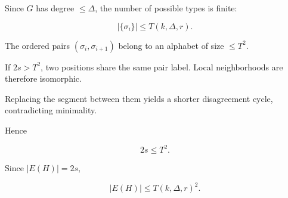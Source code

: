 \documentclass[11pt]{article}
\begin{document}
Since $G$ has degree $\le \Delta$,
the number of possible types is finite:

\[
|\{\sigma_i\}|\le T(k,\Delta,r).
\]

The ordered pairs $(\sigma_i,\sigma_{i+1})$
belong to an alphabet of size $\le T^2$.

If $2s>T^2$, two positions share the same pair label.
Local neighborhoods are therefore isomorphic.

Replacing the segment between them yields a shorter
disagreement cycle, contradicting minimality.

Hence

\[
2s\le T^2.
\]

Since $|E(H)|=2s$,

\[
|E(H)|\le T(k,\Delta,r)^2.
\]
\end{document}
